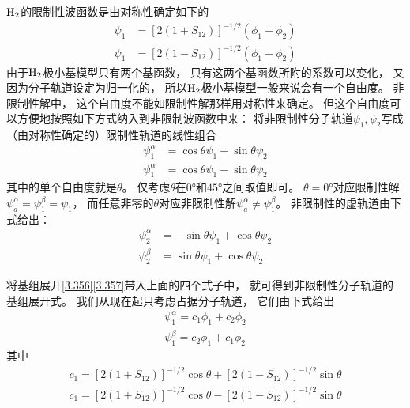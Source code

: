 $\mathrm{H}_2$的限制性波函数是由对称性确定如下的
\begin{align}
	\psi_1 &= [2(1+S_{12} )]^{-1/2}(\phi_1+\phi_2)
	\label{3.356}
	\\
	\psi_1 &= [2(1-S_{12})]^{-1/2}(\phi_1-\phi_2)
	\label{3.357}
\end{align}
由于$\mathrm{H}_2$极小基模型只有两个基函数，
只有这两个基函数所附的系数可以变化，
又因为分子轨道设定为归一化的，
所以$\mathrm{H}_2$极小基模型一般来说会有一个自由度。
非限制性解中，
这个自由度不能如限制性解那样用对称性来确定。
但这个自由度可以方便地按照如下方式纳入到非限制波函数中来：
将非限制性分子轨道$\psi_1,\psi_2$写成（由对称性确定的）限制性轨道的线性组合
\begin{align}
	\psi_1^\alpha &= \cos\theta \psi_1 + \sin\theta \psi_2 \\
	\psi_1^\alpha &= \cos\theta \psi_1 - \sin\theta \psi_2 
\end{align}
其中的单个自由度就是$\theta$。 
仅考虑$\theta$在$0\text{°}$和$45\text{°}$之间取值即可。
$\theta=0\text{°}$对应限制性解$\psi_a^\alpha=\psi_1^\beta=\psi_1$，
而任意非零的$\theta$对应非限制性解$\psi_a^\alpha \neq \psi_1^\beta$。
非限制性的虚轨道由下式给出：
\begin{align}
	\psi_2^\alpha &= - \sin\theta \psi_1 + \cos\theta \psi_2 \label{3.358}\\
	\psi_2^\beta &=  \sin\theta \psi_1 + \cos\theta \psi_2 \label{3.359}
\end{align}

将基组展开\autoref{3.356}\autoref{3.357}带入上面的四个式子中，
就可得到非限制性分子轨道的基组展开式。
我们从现在起只考虑占据分子轨道，
它们由下式给出
\begin{align}
	\psi_1^\alpha = c_1\phi_1 + c_2\phi_2 \label{3.362}\\
	\psi_1^\beta = c_2\phi_1 + c_1\phi_2 \label{3.363}
\end{align}
其中
\begin{align}
	c_1 = [2(1+S_{12} )]^{-1/2}\cos\theta + [2(1 - S_{12} )]^{-1/2}\sin\theta\\
	c_1 = [2(1+S_{12} )]^{-1/2}\cos\theta - [2(1 - S_{12} )]^{-1/2}\sin\theta
\end{align}

